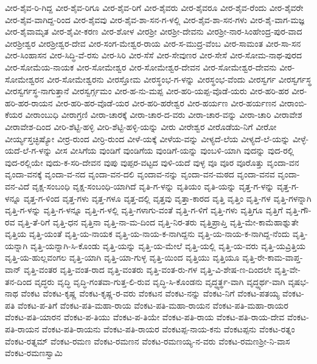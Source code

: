 ವೀರ-ಶೈವ-ರಿ-ಗಿದ್ದ
ವೀರ-ಶೈವ-ರಿಗೂ
ವೀರ-ಶೈವ-ರಿಗೆ
ವೀರ-ಶೈವರು
ವೀರ-ಶೈವರೂ
ವೀರ-ಶೈವ-ರೆಂದು
ವೀರ-ಶೈವರೇ
ವೀರ-ಶೈವ-ವಾಗಿದ್ದ-ರಿಂದ
ವೀರ-ಶೈವವು
ವೀರ-ಶೈವ-ಶಾ-ಸನ-ಗ-ಳಲ್ಲಿ
ವೀರ-ಶೈವ-ಶಾ-ಸನ-ಗಳು
ವೀರ-ಶೈ-ವಾಗ-ಮಜ್ಞ
ವೀರ-ಶೈವಾಮೃತ
ವೀರ-ಶೈವೀ-ಕರಣ
ವೀರ-ಶೋಳ
ವೀರಶ್ರೀ
ವೀರಶ್ರೀ-ದೇವನು
ವೀರಶ್ರೀ-ನಾರ-ಸಿಂಹೇಂದ್ರ-ಪುರ-ವಾದ
ವೀರಶ್ರೀಶ್ವರ
ವೀರಶ್ರೀಶ್ವರ-ದೇವ
ವೀರ-ಸಂಗ-ಮೇಶ್ವರ-ರಾಯ
ವೀರ-ಸ-ಮುದ್ರ-ವೆಂಬ
ವೀರ-ಸಾಮಂತ
ವೀರ-ಸಾ-ಸನ
ವೀರ-ಸಿಂಹಾಸನ
ವೀರ-ಸಿದ್ಧಿ-ವೆ-ರಸು
ವೀರ-ಸಿರಿ
ವೀರ-ಸೆಸೆ
ವೀರ-ಸೇವುಣರ
ವೀರ-ಸೇಸೆ
ವೀರ-ಸೋಮ-ನಾಥ-ಪುರದ
ವೀರ-ಸೋಮೆಯ-ನಾಯಕ
ವೀರ-ಸೋಮೇಶ್ವರ
ವೀರ-ಸೋಮೇಶ್ವರ-ದೇವನ
ವೀರ-ಸೋಮೇಶ್ವರ-ದೇವನು
ವೀರ-ಸೋಮೇಶ್ವರನ
ವೀರ-ಸೋಮೇಶ್ವರನು
ವೀರಸ್ತೋಮ
ವೀರಸ್ಥಂಭ-ಗ-ಳನ್ನು
ವೀರಸ್ಥಂಭ-ವೆಂದು
ವೀರಸ್ವರ್ಗ
ವೀರಸ್ವರ್ಗಸ್ಥ
ವೀರಸ್ವರ್ಗಸ್ಥ-ನಾಗುತ್ತಾನೆ
ವೀರಸ್ವರ್ಗ್ಗಮಂ
ವೀರ-ಹ-ನು-ಮಪ್ಪ
ವೀರ-ಹರಿ-ಯಪ್ಪ-ವೊಡೆ-ಯರು
ವೀರ-ಹರಿ-ಹರ
ವೀರ-ಹರಿ-ಹರ-ರಾಯನ
ವೀರ-ಹರಿ-ಹರ-ವೊಡೆ-ಯರ
ವೀರ-ಹರಿ-ಹರೇಶ್ವರ
ವೀರ-ಹರ್ಯಣ
ವೀರ-ಹರ್ಯಣನ
ವೀರಾಂಬಿ-ಕೆಯರ
ವೀರಾಂಬುಧಿ
ವೀರಾಗ್ರಣಿ
ವೀರಾ-ಚಾರಕ್ಕೆ
ವೀರಾ-ಚಾರ-ದ-ವರು
ವೀರಾ-ಚಾರ-ವನ್ನು
ವೀರಾ-ಚಾರಿ
ವೀರಾವೇಶ
ವೀರಾವೇಶ-ದಿಂದ
ವೀರಿ-ಶೆಟ್ಟಿ-ಹಳ್ಳಿ
ವೀರಿ-ಶೆಟ್ಟಿ-ಹಳ್ಳಿ-ಯನ್ನು
ವೀರು
ವೀರೇಶ್ವರ
ವೀರೊಡೆಯ-ನಿಗೆ
ವೀರೋ
ವೀರ್ಯ್ಯಸ್ತಚ್ಛಿಷ್ಯೋ
ವೀರ್ರ-ರುಂದ
ವೀರ್ರಿ-ರುಂದ
ವೀಳೆ-ಯಕ್ಕೆ
ವೀಳೆಯ-ವನ್ನು
ವೀಳ್ಯದೆ-ಲೆಯ
ವೀಳ್ಯದೆ-ಲೆ-ಯನ್ನು
ವೀಳ್ಳೆ-ಯದೆ-ಲೆ-ಗ-ಳನ್ನು
ವೀಸ
ವೀಸಿಗೆಯ
ವುಂಡಿಗೆ
ವುಂಡಿಗೆಯ
ವುಂಡಿಗೆ-ಯನ್ನು
ವುಂಬಳಿ-ಯಾಗಿ
ವುದನ್ನು
ವುದ-ರಲ್ಲಿ
ವುದ-ರಲ್ಲಿಯೇ
ವುದು-ಕ-ಸರಿ-ದೇವನ
ವುಪು
ವುಪ್ಪರ-ವಟ್ಟದ
ವುಳಿ-ಯದೆ
ವುಳ್ಳ
ವೂ
ವೂರ
ವೂರೊತ್ತು
ವೃಂದಾ-ವನ
ವೃಂದಾ-ವನಕ್ಕೆ
ವೃಂದಾ-ವ-ನದ
ವೃಂದಾ-ವನ-ದಲಿ
ವೃಂದಾವ-ನನ್ನು
ವೃಂದಾ-ವನ-ಮಠದ
ವೃಂದಾ-ವನವ
ವೃಂದಾ-ವನ-ವಿದೆ
ವೃಕ್ಷ-ಸಂಬಂಧಿ
ವೃಕ್ಷ-ಸಂಬಂಧಿ-ಯಾಗಿದೆ
ವೃತಿ-ಗ-ಳನ್ನು
ವೃತಿಯಂ
ವೃತಿ-ಯನ್ನು
ವೃತ್ತ-ಗ-ಳನ್ನು
ವೃತ್ತ-ಗ-ಳನ್ನೂ
ವೃತ್ತ-ಗ-ಳಿಂದ
ವೃತ್ತ-ಗಳು
ವೃತ್ತ-ಗಳೂ
ವೃತ್ತ-ದಲ್ಲಿ
ವೃತ್ತವು
ವೃತ್ತಾ-ಕಾರದ
ವೃತ್ತಿ
ವೃತ್ತಿಂ
ವೃತ್ತಿ-ಗಳ
ವೃತ್ತಿ-ಗಳನ್ನಾಗಿ
ವೃತ್ತಿ-ಗ-ಳನ್ನು
ವೃತ್ತಿ-ಗ-ಳನ್ನೂ
ವೃತ್ತಿ-ಗ-ಳಲ್ಲಿ
ವೃತ್ತಿ-ಗಳಾಗು-ವಂತೆ
ವೃತ್ತಿ-ಗ-ಳಿಗೆ
ವೃತ್ತಿ-ಗಳು
ವೃತ್ತಿಗೂ
ವೃತ್ತಿಗೆ
ವೃತ್ತಿ-ಗೌ-ರವ
ವೃತ್ತಿ-ತೆ-ರಿಗೆ
ವೃತ್ತಿ-ಧನ
ವೃತ್ತಿನಾ
ವೃತ್ತಿ-ನಾ-ಮ-ದಿಂದ
ವೃತ್ತಿ-ನಿರ-ತರು
ವೃತ್ತಿಪ್ರಾಪ್ತಿ
ವೃತ್ತಿ-ಮೇ-ಕಾಮೆಹಾಶ್ನುತೇ
ವೃತ್ತಿಯ
ವೃತ್ತಿ-ಯಂತೆ
ವೃತ್ತಿ-ಯ-ನಾಯಕ
ವೃತ್ತಿ-ಯ-ನಾಯ-ಕ-ನಾಗಿದ್ದನು
ವೃತ್ತಿ-ಯ-ನಾಯ-ಕ-ನಾಗಿದ್ದ-ನೆಂದು
ವೃತ್ತಿ-ಯನ್ನಾಗಿ
ವೃತ್ತಿ-ಯನ್ನಾಗಿ-ಸಿ-ಕೊಂಡು
ವೃತ್ತಿ-ಯನ್ನು
ವೃತ್ತಿ-ಯ-ಮೇಲೆ
ವೃತ್ತಿ-ಯಲ್ಲಿ
ವೃತ್ತಿ-ಯ-ವರು
ವೃತ್ತಿ-ಯವ್ರಿತ್ತಿಯ
ವೃತ್ತಿ-ಯ-ಹುಲ್ಲವಂಗಲ
ವೃತ್ತಿ-ಯಾಗಿ
ವೃತ್ತಿ-ಯಾ-ಗುಳ್ಳ
ವೃತ್ತಿ-ಯಿಂದ
ವೃತ್ತಿಯು
ವೃತ್ತಿಯೂ
ವೃತ್ತಿ-ರೇ-ಕಾಮ-ವಾಪ್ತ-ವಾನ್
ವೃತ್ತಿ-ವಂತರ
ವೃತ್ತಿ-ವಂತ-ರಾದ
ವೃತ್ತಿ-ವಂತರು
ವೃತ್ತಿ-ವಂತ-ರು-ಗಳ
ವೃತ್ತಿ-ವಿ-ಶೇಷ-ಣ-ದಿಂದಲೇ
ವೃತ್ತಿ-ವೇ-ತನ-ದಿಂದ
ವೃದ್ಧರು
ವೃದ್ಧಿ
ವೃದ್ಧಿ-ಗಂತವಾ-ಗುತ್ತ-ಲಿ-ರುವ
ವೃದ್ಧಿ-ಸಿ-ಕೊಂಡನು
ವೃದ್ಧ್ಯರ್ತ್ಥ-ವಾಗಿ
ವೃದ್ಧ್ಯರ್ಥ-ವಾಗಿ
ವೃಷಭ-ನಾಥ
ವೆಂಕಟ
ವೆಂಕಟ-ಕೃಷ್ಣ
ವೆಂಕಟ-ಕೃಷ್ಣ-ರ-ವರು
ವೆಂಕಟನ
ವೆಂಕಟ-ನನ್ನು
ವೆಂಕಟ-ನಿಗೆ
ವೆಂಕಟ-ಪತಯ್ಯ
ವೆಂಕಟ-ಪತಿ
ವೆಂಕಟ-ಪ-ತಿಗೆ
ವೆಂಕಟ-ಪತಿ-ಮಹಾ-ರಾಯ
ವೆಂಕಟ-ಪತಿ-ಮಹಾ-ರಾಯನ
ವೆಂಕಟ-ಪತಿ-ಮಹಾ-ರಾಯರ
ವೆಂಕಟ-ಪತಿ-ಯಾರನ
ವೆಂಕಟ-ಪ-ತಿಯು
ವೆಂಕಟ-ಪ-ತಿಯೇ
ವೆಂಕಟ-ಪತಿ-ರಾಯ
ವೆಂಕಟ-ಪತಿ-ರಾಯ-ದೇವ
ವೆಂಕಟ-ಪತಿ-ರಾಯನ
ವೆಂಕಟ-ಪತಿ-ರಾಯನು
ವೆಂಕಟ-ಪತಿ-ರಾಯರ
ವೆಂಕಟಪ್ಪ-ನಾಯ-ಕನು
ವೆಂಕಟಪ್ಪನು
ವೆಂಕಟ-ರತ್ನಂ
ವೆಂಕಟ-ರತ್ನಮ್
ವೆಂಕಟ-ರಮಣ
ವೆಂಕಟ-ರಮಣನ
ವೆಂಕಟ-ರಮಣಯ್ಯ-ನ-ವರು
ವೆಂಕಟ-ರಮಣಶ್ರೀ-ನಿ-ವಾಸ
ವೆಂಕಟ-ರಮಣಸ್ವಾಮಿ
